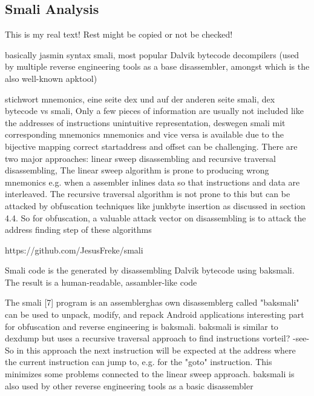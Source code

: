 \subsection{Smali Analysis} \label{subsection:tools-baksmali}
This is my real text! Rest might be copied or not be checked!

basically jasmin syntax
%
smali, most popular Dalvik bytecode decompilers (used by multiple reverse engineering tools as a base disassembler, amongst which is the also well-known apktool)
\cite{kovachevaMaster}
%

stichwort mnemonics, eine seite dex und auf der anderen seite smali, dex bytecode vs smali, Only a few pieces of information are usually not included like the addresses of instructions\newline
unintuitive representation, deswegen smali mit corresponding mnemonics\newline
mnemonics and vice versa is available due to the bijective mapping\newline
correct startaddress and offset can be challenging. There are two major approaches: linear sweep disassembling and recursive traversal disassembling, The linear sweep algorithm is prone to producing wrong mnemonics e.g. when a assembler inlines data so that instructions and data are interleaved. The recursive traversal algorithm is not prone to this but can be attacked by obfuscation techniques like junkbyte insertion as discussed in section 4.4. So for obfuscation, a valuable attack vector on disassembling is to attack the address finding step of these algorithms\newline

https://github.com/JesusFreke/smali

Smali code is the generated by disassembling Dalvik bytecode using baksmali. The result is a human-readable, assambler-like code

The smali [7] program is an \gls{assemblerg}has own \gls{disassemblerg} called "baksmali"\newline
can be used to unpack, modify, and repack Android applications\newline
interesting part for obfuscation and reverse engineering is baksmali. baksmali is similar to dexdump but uses a recursive traversal approach to find instructions\newline
vorteil? -see- So in this approach the next instruction will be expected at the address where the current instruction can jump to, e.g. for the "goto" instruction. This minimizes some problems connected to the linear sweep approach. baksmali is also used by other reverse engineering tools as a basic disassembler\newline


